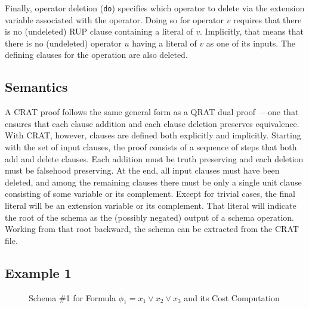 \documentclass{llncs}
\begin{document}
Finally, operator deletion ({\tt do}) specifies which operator to
delete via the extension variable associated with the operator.  Doing
so for operator $v$ requires that there is no
(undeleted) RUP clause containing a literal of $v$.
Implicitly, that means
that there is no (undeleted) operator $u$
having a literal of $v$ as one of its inputs.  The defining clauses for the operation are also deleted.

\subsection{Semantics}

A CRAT proof follows the same general form as a QRAT dual
proof~\cite{bryant:cade:2021}---one that ensures that each clause
addition and each clause deletion preserves equivalence.  With CRAT,
however, clauses are defined both explicitly and implicitly.  Starting
with the set of input clauses, the proof consists of a sequence of steps that
both add and delete clauses.  Each addition must be truth preserving
and each deletion must be falsehood preserving.  At the end, all input
clauses must have been deleted, and among the remaining clauses there
must be only a single unit clause consisting of some variable or its
complement.  Except for trivial cases, the final literal will be an
extension variable or its complement.  That literal will indicate the
root of the schema as the (possibly negated) output of a schema
operation.  Working from that root backward, the schema can be
extracted from the CRAT file.

\subsection{Example 1}

\begin{figure}
\caption{Schema \#1 for Formula $\phi_1 = x_1 \lor x_2 \lor x_3$ and its Cost Computation}
\label{fig:c3:schema}
\end{figure}
\end{document}
